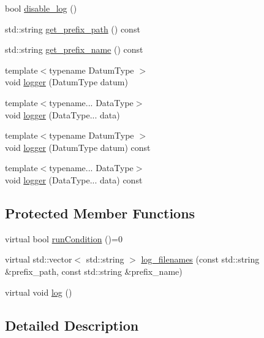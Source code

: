 \begin{DoxyCompactItemize}
bool \mbox{\hyperlink{classbfl_1_1Logger_a440467a28ccc46490d767fe0ef6f556a}{disable\+\_\+log}} ()
\item 
std\+::string \mbox{\hyperlink{classbfl_1_1Logger_a56cf1a4e712bf23d9978420a8a59a62b}{get\+\_\+prefix\+\_\+path}} () const
\item 
std\+::string \mbox{\hyperlink{classbfl_1_1Logger_a913a795b7bfbf378815eeb342d68a7c0}{get\+\_\+prefix\+\_\+name}} () const
\item 
{\footnotesize template$<$typename Datum\+Type $>$ }\\void \mbox{\hyperlink{classbfl_1_1Logger_a1033ff31398484f2132f84fd140da9e3}{logger}} (Datum\+Type datum)
\item 
{\footnotesize template$<$typename... Data\+Type$>$ }\\void \mbox{\hyperlink{classbfl_1_1Logger_aca2086c9256e5c404872b91f7f25b97d}{logger}} (Data\+Type... data)
\item 
{\footnotesize template$<$typename Datum\+Type $>$ }\\void \mbox{\hyperlink{classbfl_1_1Logger_a50b1c109730fa98f66e66f420f0158fe}{logger}} (Datum\+Type datum) const
\item 
{\footnotesize template$<$typename... Data\+Type$>$ }\\void \mbox{\hyperlink{classbfl_1_1Logger_a0f0cf7ce956546d94dfb1feb7cebf171}{logger}} (Data\+Type... data) const
\end{DoxyCompactItemize}
\subsection*{Protected Member Functions}
\begin{DoxyCompactItemize}
\item 
virtual bool \mbox{\hyperlink{classbfl_1_1FilteringAlgorithm_a5fc12882356f6906b102fbfff2bc4b7c}{run\+Condition}} ()=0
\item 
virtual std\+::vector$<$ std\+::string $>$ \mbox{\hyperlink{classbfl_1_1Logger_a328ceaa8e70e6918f11142b12b8be217}{log\+\_\+filenames}} (const std\+::string \&prefix\+\_\+path, const std\+::string \&prefix\+\_\+name)
\item 
virtual void \mbox{\hyperlink{classbfl_1_1Logger_ad44f46593cb8c4c87c1178eb326e2f64}{log}} ()
\end{DoxyCompactItemize}


\subsection{Detailed Description}



